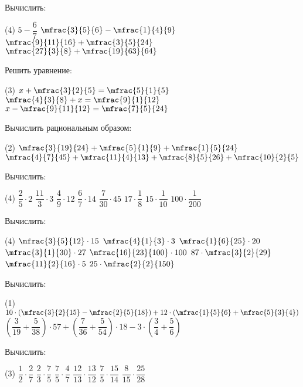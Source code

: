 \begin{class}[number=3]
	\begin{listofex}
		\item Вычислить:
		\begin{tasks}(4)
			\task \( 5-\dfrac{6}{7} \)
			\task \( \mfrac{3}{5}{6}-\mfrac{1}{4}{9} \)
			\task \( \mfrac{9}{11}{16}+\mfrac{3}{5}{24} \)
			\task \( \mfrac{27}{3}{8}+\mfrac{19}{63}{64} \)
		\end{tasks}
		\item Решить уравнение:
		\begin{tasks}(3)
			\task \( x+\mfrac{3}{2}{5}=\mfrac{5}{1}{5} \)
			\task \( \mfrac{4}{3}{8}+x=\mfrac{9}{1}{12} \)
			\task \( x-\mfrac{9}{11}{12}=\mfrac{7}{5}{24} \)
		\end{tasks}
		\item Вычислить рациональным образом:
		\begin{tasks}(2)
			\task \( \mfrac{3}{19}{24}+\mfrac{5}{1}{9}+\mfrac{1}{5}{24} \)
			\task \( \mfrac{4}{7}{45}+\mfrac{11}{4}{13}+\mfrac{8}{5}{26}+\mfrac{10}{2}{5} \)
		\end{tasks}
		\item Вычислить:
		\begin{tasks}(4)
			\task \( \dfrac{2}{5}\cdot2 \)
			\task \( \dfrac{11}{3}\cdot3 \)
			\task \( \dfrac{4}{9}\cdot12 \)
			\task \( \dfrac{6}{7}\cdot14 \)
			\task \( \dfrac{7}{30}\cdot45 \)
			\task \( 17\cdot\dfrac{1}{8} \)
			\task \( 15\cdot\dfrac{1}{10} \)
			\task \( 100\cdot\dfrac{1}{200} \)
		\end{tasks}
		\item Вычислить:
		\begin{tasks}(4)
			\task \( \mfrac{3}{5}{12}\cdot15 \)
			\task \( \mfrac{4}{1}{3}\cdot3 \)
			\task \( \mfrac{1}{6}{25}\cdot20 \)
			\task \( \mfrac{3}{1}{30}\cdot27 \)
			\task \( \mfrac{16}{23}{100}\cdot100 \)
			\task \( 87\cdot\mfrac{3}{2}{29} \)
			\task \( \mfrac{11}{2}{16}\cdot5 \)
			\task \( 25\cdot\mfrac{2}{2}{150} \)
		\end{tasks}
		\item Вычислить:
		\begin{tasks}(1)
			\task \( 10\cdot\left( \mfrac{3}{2}{15}-\mfrac{2}{5}{18} \right)+12\cdot\left( \mfrac{1}{5}{6}+\mfrac{5}{3}{4} \right) \)
			\task \( \left( \dfrac{3}{19}+\dfrac{5}{38} \right)\cdot57+\left( \dfrac{7}{36}+\dfrac{5}{54} \right)\cdot18-3\cdot\left( \dfrac{3}{4}+\dfrac{5}{6} \right) \)
		\end{tasks}
		\item Вычислить:
		\begin{tasks}(3)
			\task \( \dfrac{1}{2}\cdot\dfrac{2}{7} \)
			\task \( \dfrac{2}{3}\cdot\dfrac{7}{5} \)
			\task \( \dfrac{7}{5}\cdot\dfrac{4}{7} \)
			\task \( \dfrac{12}{13}\cdot\dfrac{13}{12} \)
			\task \( \dfrac{7}{5}\cdot\dfrac{15}{14} \)
			\task \( \dfrac{8}{15}\cdot\dfrac{25}{28} \)
		\end{tasks}
	\end{listofex}
\end{class}

